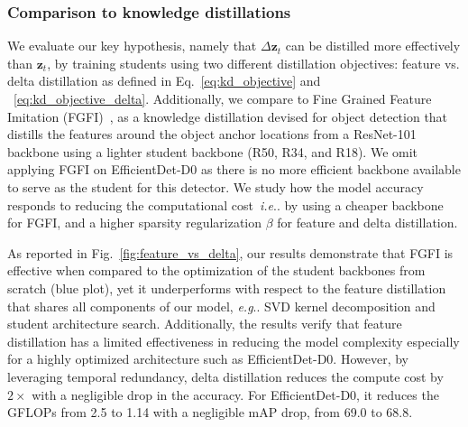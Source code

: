 \documentclass[runningheads]{llncs}
\makeatletter
\def\z{\mathbf{z}}
\def\zt{\z_t}
\def\dzt{\Delta\zt}
\DeclareRobustCommand\onedot{\futurelet\@let@token\@onedot}
\def\@onedot{\ifx\@let@token.\else.\null\fi\xspace}
\def\eg{\emph{e.g}\onedot} \def\Eg{\emph{E.g}\onedot}
\def\ie{\emph{i.e}\onedot} \def\Ie{\emph{I.e}\onedot}
\makeatother
\begin{document}
\subsubsection{Comparison to knowledge distillations}
We evaluate our key hypothesis, namely that $\dzt$ can be distilled more effectively than $\zt$, by training students using two different distillation objectives: feature vs. delta distillation as defined in Eq.~\ref{eq:kd_objective} and ~\ref{eq:kd_objective_delta}. Additionally, we compare to Fine Grained Feature Imitation (FGFI)~\cite{fgfi}, as a knowledge distillation devised for object detection that distills the features around the object anchor locations from a ResNet-101 backbone using a lighter student backbone (R50, R34, and R18). We omit applying FGFI on EfficientDet-D0 as there is no more efficient backbone available to serve as the student for this detector. We study how the model accuracy responds to reducing the computational cost~\ie by using a cheaper backbone for FGFI, and a higher sparsity regularization $\beta$ for feature and delta distillation.

As reported in Fig.~\ref{fig:feature_vs_delta}, our results demonstrate that FGFI is effective when compared to the optimization of the student backbones from scratch (blue plot), yet it underperforms with respect to the feature distillation that shares all components of our model, \eg SVD kernel decomposition and student architecture search. Additionally, the results verify that feature distillation has a limited effectiveness in reducing the model complexity especially for a highly optimized architecture such as EfficientDet-D0. However, by leveraging temporal redundancy, delta distillation reduces the compute cost by $2\times$ with a negligible drop in the accuracy. For EfficientDet-D0, it reduces the GFLOPs from 2.5 to 1.14 with a negligible mAP drop, from 69.0 to 68.8.
\end{document}
